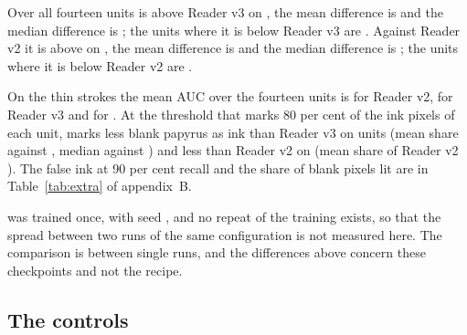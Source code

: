 Over all fourteen units \MfName{} is above Reader v3 on \MfAllKTextThree{}, the mean difference is \MfAllMeanDiffThreeAuc{} and the median difference is \MfAllMedianDiffThreeAuc{}; the units where it is below Reader v3 are \MfBelowListAllThree{}. Against Reader v2 it is above on \MfAllKTextTwo{}, the mean difference is \MfAllMeanDiffTwoAuc{} and the median difference is \MfAllMedianDiffTwoAuc{}; the units where it is below Reader v2 are \MfBelowListAllTwo{}.

On the thin strokes the mean AUC over the fourteen units is \MfAllMeanRTwoThin{} for Reader v2, \MfAllMeanRThreeThin{} for Reader v3 and \MfAllMeanOwnThin{} for \MfName{}. At the threshold that marks 80 per cent of the ink pixels of each unit, \MfName{} marks less blank papyrus as ink than Reader v3 on \MfAllFaLessThree{} units (mean share \MfAllMeanOwnFaEighty{} against \MfAllMeanRThreeFaEighty{}, median \MfAllMedianOwnFaEighty{} against \MfAllMedianRThreeFaEighty{}) and less than Reader v2 on \MfAllFaLessTwo{} (mean share of Reader v2 \MfAllMeanRTwoFaEighty{}). The false ink at 90 per cent recall and the share of blank pixels lit are in Table~\ref{tab:extra} of appendix~B.

\MfName{} was trained once, with seed \Seed{}, and no repeat of the training exists, so that the spread between two runs of the same configuration is not measured here. The comparison is between single runs, and the differences above concern these checkpoints and not the recipe.

\subsection{The controls}\label{sec:controls-Mf}

